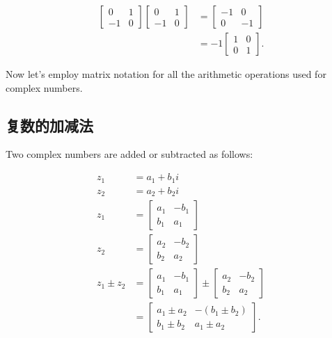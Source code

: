 $$
\begin{aligned}
{\left[\begin{array}{cc}
0 & 1 \\
-1 & 0
\end{array}\right]\left[\begin{array}{cc}
0 & 1 \\
-1 & 0
\end{array}\right] } & =\left[\begin{array}{cc}
-1 & 0 \\
0 & -1
\end{array}\right] \\
& =-1\left[\begin{array}{ll}
1 & 0 \\
0 & 1
\end{array}\right] .
\end{aligned}
$$

Now let's employ matrix notation for all the arithmetic operations used for complex numbers.

\subsection{复数的加减法}
Two complex numbers are added or subtracted as follows:

$$
\begin{aligned}
z_{1} & =a_{1}+b_{1} i \\
z_{2} & =a_{2}+b_{2} i \\
z_{1} & =\left[\begin{array}{cc}
a_{1} & -b_{1} \\
b_{1} & a_{1}
\end{array}\right] \\
z_{2} & =\left[\begin{array}{cc}
a_{2} & -b_{2} \\
b_{2} & a_{2}
\end{array}\right] \\
z_{1} \pm z_{2} & =\left[\begin{array}{cc}
a_{1} & -b_{1} \\
b_{1} & a_{1}
\end{array}\right] \pm\left[\begin{array}{cc}
a_{2} & -b_{2} \\
b_{2} & a_{2}
\end{array}\right] \\
& =\left[\begin{array}{ll}
a_{1} \pm a_{2} & -\left(b_{1} \pm b_{2}\right) \\
b_{1} \pm b_{2} & a_{1} \pm a_{2}
\end{array}\right] .
\end{aligned}
$$

